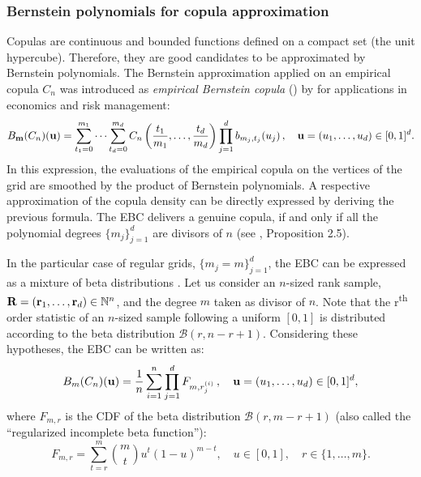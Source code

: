 \subsubsection{Bernstein polynomials for copula approximation}
Copulas are continuous and bounded functions defined on a compact set (the unit hypercube). 
Therefore, they are good candidates to be approximated by Bernstein polynomials. 
The Bernstein approximation applied on an empirical copula $C_n$ was introduced as \emph{empirical Bernstein copula} () by \cite{sancetta_satchell_2004} for applications in economics and risk management: 
\begin{equation}
    B_{{\bf m}}(C_n)({\bf u}) = \sum_{t_1=0}^{m_1} \dots \sum_{t_d=0}^{m_d} C_n\left(\frac{t_1}{m_1}, \dots, \frac{t_d}{m_d}\right) \prod_{j=1}^d b_{m_j, t_j}(u_j) \, , \quad  {\bf u} = (u_1, \dots, u_d) \in [0, 1]^d.
    \label{eq:ebc}
\end{equation}
In this expression, the evaluations of the empirical copula on the vertices of the grid are smoothed by the product of Bernstein polynomials. 
A respective approximation of the copula density can be directly expressed by deriving the previous formula. 
The EBC delivers a genuine copula, if and only if all the polynomial degrees $\{m_j\}_{j=1}^d$ are divisors of $n$ (see \citealp{segers_2017}, Proposition 2.5). 

In the particular case of regular grids, $\{m_j=m\}_{j=1}^d$, the EBC can be expressed as a mixture of beta distributions \citep{segers_2017}. 
Let us consider an $n$-sized rank sample, ${\bf R}=({\bf r}_1, \dots, {\bf r}_d) \in \mathbb{N}^{n}$, and the degree $m$ taken as divisor of $n$. 
Note that the r\textsuperscript{th} order statistic of an $n$-sized sample following a uniform $[0, 1]$ is distributed according to the beta distribution $\mathcal{B}(r, n-r+1)$. 
Considering these hypotheses, the EBC can be written as: 
\begin{equation}
    B_{m}(C_n)({\bf u}) = \frac 1n \sum_{i=1}^n \prod_{j=1}^{d} F_{m, r_j^{(i)}} \, , \quad  {\bf u} = (u_1, \dots, u_d) \in [0, 1]^d, 
\end{equation}
where $F_{m, r}$ is the CDF of the beta distribution $\mathcal{B}(r, m-r+1)$ (also called the ``regularized incomplete beta function''): 
\begin{equation}
    F_{m, r} = \sum_{t=r}^{m} \binom{m}{t}u^t(1-u)^{m-t}, \quad u \in [0, 1], \quad r \in \{1, \dots, m\}. 
\end{equation}

